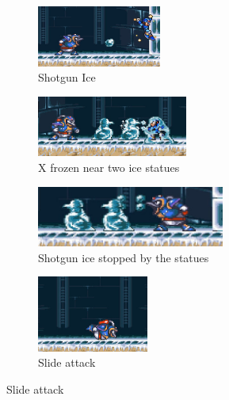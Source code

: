 \begin{figure}[htp]
	\centering
	\begin{subfigure}{0.4\textwidth}
		\centering
		\includegraphics[height=2cm]{figures/X1/Chill_penguin/Chill_shot.jpg}
		\caption{Shotgun Ice}
	\end{subfigure}
	\begin{subfigure}{0.4\textwidth}
		\centering
		\includegraphics[height=2cm]{figures/X1/Chill_penguin/Chill_frozen.jpg}
		\caption{X frozen near two ice statues}
	\end{subfigure}
	\begin{subfigure}[c]{0.5\textwidth}
		\centering
		\includegraphics[height=2cm]{figures/X1/Chill_penguin/Chill_shatter.jpg}
		\caption{Shotgun ice stopped by the statues}
	\end{subfigure}
	\begin{subfigure}[c]{0.4\textwidth}
		\centering
		\includegraphics[height=2.5cm]{figures/X1/Chill_penguin/Chill_slide.jpg}
		\caption{Slide attack}
	\end{subfigure}
\end{figure}
